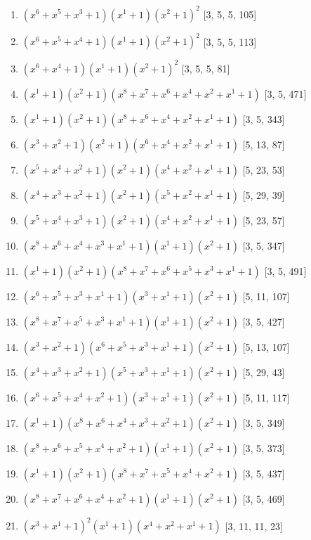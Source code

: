 \documentclass[10pt,twocolumn]{article}
\begin{document}
\begin{enumerate}
\item $(x^{6} + x^{5} + x^{3} + 1)(x^{1} + 1)(x^{2} + 1)^{2}$  [3, 5, 5, 105]
\item $(x^{6} + x^{5} + x^{4} + 1)(x^{1} + 1)(x^{2} + 1)^{2}$  [3, 5, 5, 113]
\item $(x^{6} + x^{4} + 1)(x^{1} + 1)(x^{2} + 1)^{2}$  [3, 5, 5, 81]
\item $(x^{1} + 1)(x^{2} + 1)(x^{8} + x^{7} + x^{6} + x^{4} + x^{2} + x^{1} + 1)$  [3, 5, 471]
\item $(x^{1} + 1)(x^{2} + 1)(x^{8} + x^{6} + x^{4} + x^{2} + x^{1} + 1)$  [3, 5, 343]
\item $(x^{3} + x^{2} + 1)(x^{2} + 1)(x^{6} + x^{4} + x^{2} + x^{1} + 1)$  [5, 13, 87]
\item $(x^{5} + x^{4} + x^{2} + 1)(x^{2} + 1)(x^{4} + x^{2} + x^{1} + 1)$  [5, 23, 53]
\item $(x^{4} + x^{3} + x^{2} + 1)(x^{2} + 1)(x^{5} + x^{2} + x^{1} + 1)$  [5, 29, 39]
\item $(x^{5} + x^{4} + x^{3} + 1)(x^{2} + 1)(x^{4} + x^{2} + x^{1} + 1)$  [5, 23, 57]
\item $(x^{8} + x^{6} + x^{4} + x^{3} + x^{1} + 1)(x^{1} + 1)(x^{2} + 1)$  [3, 5, 347]
\item $(x^{1} + 1)(x^{2} + 1)(x^{8} + x^{7} + x^{6} + x^{5} + x^{3} + x^{1} + 1)$  [3, 5, 491]
\item $(x^{6} + x^{5} + x^{3} + x^{1} + 1)(x^{3} + x^{1} + 1)(x^{2} + 1)$  [5, 11, 107]
\item $(x^{8} + x^{7} + x^{5} + x^{3} + x^{1} + 1)(x^{1} + 1)(x^{2} + 1)$  [3, 5, 427]
\item $(x^{3} + x^{2} + 1)(x^{6} + x^{5} + x^{3} + x^{1} + 1)(x^{2} + 1)$  [5, 13, 107]
\item $(x^{4} + x^{3} + x^{2} + 1)(x^{5} + x^{3} + x^{1} + 1)(x^{2} + 1)$  [5, 29, 43]
\item $(x^{6} + x^{5} + x^{4} + x^{2} + 1)(x^{3} + x^{1} + 1)(x^{2} + 1)$  [5, 11, 117]
\item $(x^{1} + 1)(x^{8} + x^{6} + x^{4} + x^{3} + x^{2} + 1)(x^{2} + 1)$  [3, 5, 349]
\item $(x^{8} + x^{6} + x^{5} + x^{4} + x^{2} + 1)(x^{1} + 1)(x^{2} + 1)$  [3, 5, 373]
\item $(x^{1} + 1)(x^{2} + 1)(x^{8} + x^{7} + x^{5} + x^{4} + x^{2} + 1)$  [3, 5, 437]
\item $(x^{8} + x^{7} + x^{6} + x^{4} + x^{2} + 1)(x^{1} + 1)(x^{2} + 1)$  [3, 5, 469]
\item $(x^{3} + x^{1} + 1)^{2}(x^{1} + 1)(x^{4} + x^{2} + x^{1} + 1)$  [3, 11, 11, 23]

\end{enumerate}
\end{document}
